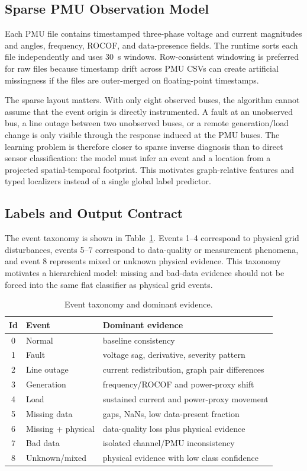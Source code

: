 \documentclass[conference]{IEEEtran}
\begin{document}
\subsection{Sparse PMU Observation Model}
Each PMU file contains timestamped three-phase voltage and current magnitudes and angles, frequency, ROCOF, and data-presence fields. The runtime sorts each file independently and uses 30~s windows. Row-consistent windowing is preferred for raw files because timestamp drift across PMU CSVs can create artificial missingness if the files are outer-merged on floating-point timestamps.

The sparse layout matters. With only eight observed buses, the algorithm cannot assume that the event origin is directly instrumented. A fault at an unobserved bus, a line outage between two unobserved buses, or a remote generation/load change is only visible through the response induced at the PMU buses. The learning problem is therefore closer to sparse inverse diagnosis than to direct sensor classification: the model must infer an event and a location from a projected spatial-temporal footprint. This motivates graph-relative features and typed localizers instead of a single global label predictor.

\subsection{Labels and Output Contract}

The event taxonomy is shown in Table~\ref{tab:taxonomy}. Events 1--4 correspond to physical grid disturbances, events 5--7 correspond to data-quality or measurement phenomena, and event 8 represents mixed or unknown physical evidence. This taxonomy motivates a hierarchical model: missing and bad-data evidence should not be forced into the same flat classifier as physical grid events.

\begin{table}[t]
\centering
\caption{Event taxonomy and dominant evidence.}
\label{tab:taxonomy}
\renewcommand{\arraystretch}{1.06}
\footnotesize
\begin{tabular}{@{}cll@{}}
\toprule
\textbf{Id} & \textbf{Event} & \textbf{Dominant evidence} \\
\midrule
0 & Normal & baseline consistency \\
1 & Fault & voltage sag, derivative, severity pattern \\
2 & Line outage & current redistribution, graph pair differences \\
3 & Generation & frequency/ROCOF and power-proxy shift \\
4 & Load & sustained current and power-proxy movement \\
5 & Missing data & gaps, NaNs, low data-present fraction \\
6 & Missing + physical & data-quality loss plus physical evidence \\
7 & Bad data & isolated channel/PMU inconsistency \\
8 & Unknown/mixed & physical evidence with low class confidence \\
\bottomrule
\end{tabular}
\end{table}
\end{document}
